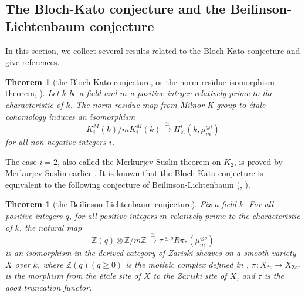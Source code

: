 \documentclass{amsart}
\newtheorem{thm}[theorem]{Theorem}
\theoremstyle{definition}
\theoremstyle{remark}
\newcommand{\mbb}{\mathbb}
\newcommand{\ZZ}{\mbb{Z}}
\newcommand{\et}{\text{\'et}}
\begin{document}
\subsection{The Bloch-Kato conjecture and the Beilinson-Lichtenbaum conjecture}\label{sec:bkbl}
In this section, we collect several results related to the Bloch-Kato conjecture and give references.
\begin{thm}[the Bloch-Kato conjecture, or the norm residue isomorphism theorem, {\cite[Theorem 6.1]{Voevodsky_Bloch_Kato}}]\label{bk}
    Let $k$ be a field and $m$ a positive integer relatively prime to the characteristic of $k$. The norm residue map from Milnor K-group to \'etale cohomology induces an isomorphism
    \[
    K^M_i(k)/m K^M_i(k) \xrightarrow{\cong} H^i_\et(k, \mu_m^{\otimes i})
    \]
    for all non-negative integers $i$.
\end{thm}
The case $i=2$, also called the Merkurjev-Suslin theorem on $K_2$, is proved by Merkurjev-Suslin earlier \cite[Theorem 11.5]{Merkujev_Suslin}.
It is known that the Bloch-Kato conjecture is equivalent to the following conjecture of Beilinson-Lichtenbaum (\cite[Theorem 7.4]{Suslin_Voevodsky_BK_BL}, \cite[Theorem 1.1]{Geisser_Levine} ).
\begin{thm}[the Beilinson-Lichtenbaum conjecture]\label{bl}
    Fix a field $k$. For all positive integers $q$, for all positive integers $m$ relatively prime to the characteristic of $k$, the natural map 
    \[
    \ZZ(q) \otimes \ZZ/m\ZZ \xrightarrow{\cong}\tau^{\leq q}R\pi_*(\mu_m^{\otimes q})
    \]
is an isomorphism in the derived category of Zariski sheaves on a smooth
variety $X$ over $k$, where $\ZZ(q) (q \geq 0)$ is the motivic complex defined in \cite[Definition 3.1]{Suslin_Voevodsky_BK_BL}, $\pi: X_\et \to X_{\text{Zar}}$ is the morphism from the \'etale site of $X$ to the Zariski site of $X$, and $\tau$ is the good truncation functor.
\end{thm}
\end{document}
